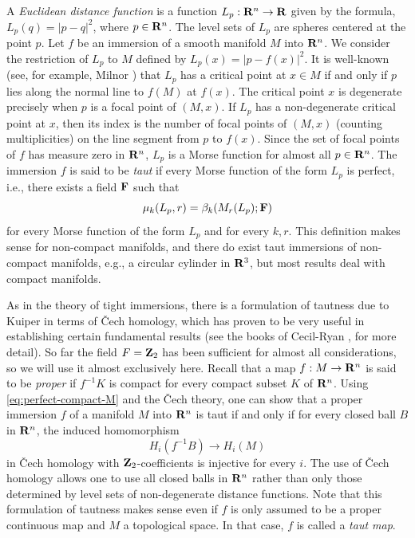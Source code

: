 \documentclass[12pt]{article}
\begin{document}
A {\em Euclidean distance function} is a function 
$L_p:{\bf R}^n \rightarrow {\bf R}$ given by the formula, 
$L_p(q) = | p-q |^2$,
where $p \in {\bf R}^n$.
The level sets of $L_p$ are spheres centered at the point $p$.  Let
$f$ be an immersion of a smooth manifold $M$ into ${\bf R}^n$.
We consider the restriction of $L_p$ to $M$ defined by
$L_p(x) =  | p-f(x)|^2$.  It is well-known (see, for example,
Milnor \cite[pp. 33-38]{Mil}) 
that $L_p$ has a critical point at $x \in M$ if
and only if $p$ lies along the normal line to $f(M)$ at $f(x)$.
The critical point $x$ is degenerate precisely when $p$ is a
focal point of $(M,x)$.  If $L_p$ has a non-degenerate critical point
at $x$, then its index is the number of focal points of $(M,x)$
(counting multiplicities) on the line segment from $p$ to
$f(x)$.  Since the set of focal points of $f$ has measure zero
in ${\bf R}^n$, $L_p$ is a Morse function for almost all
$p \in {\bf R}^n$.  The immersion $f$ is said to be {\em taut}
if every Morse function of the form $L_p$ is perfect, i.e.,
there exists a field ${\bf F}$ such that
\begin{displaymath}
\mu_k(L_p,r) = \beta_k(M_r(L_p);{\bf F})
\end{displaymath}
for every Morse function of the form $L_p$ and for every $k,r$.
This definition makes sense for non-compact manifolds, and there do
exist taut immersions of non-compact manifolds, e.g., a circular
cylinder in ${\bf R}^3$, but most results deal with compact
manifolds.

As in the theory of tight immersions, there is a formulation of
tautness due to Kuiper in terms of \v{C}ech 
homology, which has proven to be 
very useful in establishing certain fundamental results (see the books 
of Cecil-Ryan \cite[pp. 113--125]{CR7}, \cite[pp. 40--45]{CR8} for more detail).  So far 
the field $F={\bf Z}_2$ has been sufficient for almost all
considerations, so we will use it almost exclusively here.  Recall that
a map $f:M \rightarrow {\bf R}^n$ is said to be {\em proper}
if $f^{-1}K$ is compact for every compact subset $K$ of
${\bf R}^n$.  Using \eqref{eq:perfect-compact-M} and the \v{C}ech theory, one can show that a
proper immersion $f$ of a manifold $M$ into ${\bf R}^n$ is taut
if and only if for every closed ball $B$ in ${\bf R}^n$, the
induced homomorphism
\begin{equation}
\label{eq:def-taut}
H_i(f^{-1}B) \rightarrow H_i(M)
\end{equation}
in \v{C}ech homology with ${\bf Z}_2$-coefficients is injective for
every $i$.    
The use of \v{C}ech homology allows one to use all closed
balls in ${\bf R}^n$ rather than only those determined by level
sets of non-degenerate distance functions.  Note that this formulation
of tautness makes sense even if $f$ is only assumed to be a
proper continuous map and $M$ a topological space.  In that case,
$f$ is called a {\em taut map}.
\end{document}
